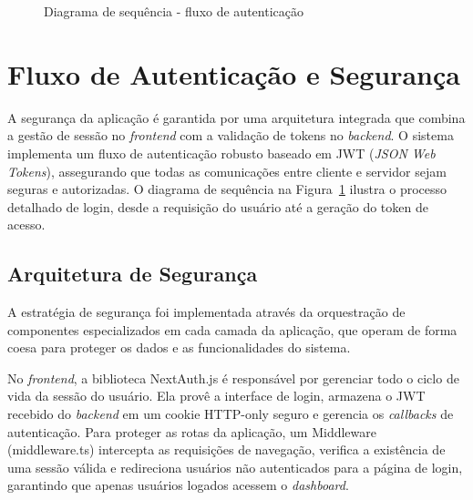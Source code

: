 \begin{figure}[htbp]
    \caption{Diagrama de sequência - fluxo de autenticação}
    \label{fig:fluxo-auth}
\end{figure}

\section{Fluxo de Autenticação e Segurança}

A segurança da aplicação é garantida por uma arquitetura integrada que combina a gestão de sessão no \textit{frontend} com a validação de tokens no \textit{backend}. O sistema implementa um fluxo de autenticação robusto baseado em JWT (\textit{JSON Web Tokens}), assegurando que todas as comunicações entre cliente e servidor sejam seguras e autorizadas. O diagrama de sequência na Figura~\ref{fig:fluxo-auth} ilustra o processo detalhado de login, desde a requisição do usuário até a geração do token de acesso.

\subsection{Arquitetura de Segurança}

A estratégia de segurança foi implementada através da orquestração de componentes especializados em cada camada da aplicação, que operam de forma coesa para proteger os dados e as funcionalidades do sistema.

No \textit{frontend}, a biblioteca NextAuth.js é responsável por gerenciar todo o ciclo de vida da sessão do usuário. Ela provê a interface de login, armazena o JWT recebido do \textit{backend} em um cookie HTTP-only seguro e gerencia os \textit{callbacks} de autenticação. Para proteger as rotas da aplicação, um Middleware (middleware.ts) intercepta as requisições de navegação, verifica a existência de uma sessão válida e redireciona usuários não autenticados para a página de login, garantindo que apenas usuários logados acessem o \textit{dashboard}.

